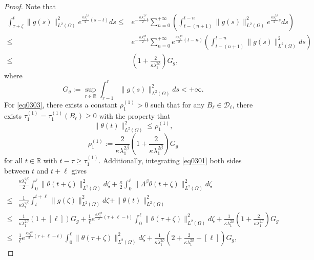 \documentclass[10pt,a4paper]{amsart}
\begin{document}
\begin{proof}
Note that
\begin{align*}
   \int_{\tau+\zeta}^{t} \|g(s)\|_{L^2(\Omega)}^2 e^{\frac{\kappa\lambda_{1}^{2\beta}}{2}(s-t)} ds
   \leq & e^{-\frac{\kappa\lambda_{1}^{2\beta}}{2}t} \sum_{n=0}^{+\infty} \left(\int_{t-(n+1)}^{t-n} \|g(s)\|_{L^2(\Omega)}^2 e^{\frac{\kappa\lambda_{1}^{2\beta}}{2}s} ds\right) \\
   \leq & e^{-\frac{\kappa\lambda_{1}^{2\beta}}{2}t} \sum_{n=0}^{+\infty} e^{\frac{\kappa\lambda_{1}^{2\beta}}{2}(t-n)} \left(\int_{t-(n+1)}^{t-n} \|g(s)\|_{L^2(\Omega)}^2 ds\right) \\
   \leq & \left(1+\frac{2}{\kappa\lambda_{1}^{2\beta}}\right)G_g,
\end{align*}
where
$$
G_g:=\sup_{r \in \mathbb{R}}\int_{r-1}^{r}\|g(s)\|_{L^2(\Omega)}^2 ds< +\infty.
$$
For \cref{eq0303}, there exists a constant $\rho_{1}^{(1)} > 0$ such that for any $B_{\ell} \in \mathcal{D}_{\ell}$, there exists $\tau_{1}^{(1)} = \tau_{1}^{(1)}(B_{\ell}) \geq 0$ with the property that 
\begin{equation}\label{eq0317}
    \|\theta(t)\|_{L^2(\Omega)}^2
   \leq 
   \rho_{1}^{(1)},
\end{equation}
\[   
   \rho_{1}^{(1)}
   :=  
   \frac{2}{\kappa\lambda_{1}^{2\beta}} \left(1+\frac{2}{\kappa\lambda_{1}^{2\beta}}\right)G_g
\]
for all $t \in \mathbb{R}$ with $t - \tau \geq \tau_{1}^{(1)}$. Additionally, integrating \cref{eq0301} both sides between $t$ and $t+\ell$ gives
\begin{equation}\label{eq0307}
\begin{aligned}
    & \frac{\kappa\lambda_1^{2\beta}}{2} \int_{0}^{\ell} \|\theta(t+\zeta)\|_{L^2(\Omega)}^2 d\zeta 
    + 
    \frac{\kappa}{2} \int_{0}^{\ell} \| \Lambda^\beta \theta(t+\zeta)\|_{L^2(\Omega)}^2 d\zeta \\
    \leq & \frac{1}{\kappa\lambda_1^{2\beta}} \int_{t}^{t+\ell} \|g(\zeta)\|_{L^2(\Omega)}^2 d\zeta + \|\theta(t)\|_{L^2(\Omega)}^2 \\
    \leq & \frac{1}{\kappa\lambda_1^{2\beta}} \left(1+[\ell]\right)G_g
    + \frac{1}{\ell} e^{\frac{\kappa\lambda_{1}^{2\beta}}{2}(\tau+\ell-t)} \int_{0}^{\ell} \|\theta(\tau+\zeta)\|_{L^2(\Omega)}^2 d\zeta 
    + \frac{1}{\kappa\lambda_{1}^{2\beta}} \left(1+\frac{2}{\kappa\lambda_{1}^{2\beta}}\right)G_g \\
    \leq & \frac{1}{\ell} e^{\frac{\kappa\lambda_{1}^{2\beta}}{2}(\tau+\ell-t)} \int_{0}^{\ell} \|\theta(\tau+\zeta)\|_{L^2(\Omega)}^2 d\zeta 
    + \frac{1}{\kappa\lambda_{1}^{2\beta}} \left(2+\frac{2}{\kappa\lambda_{1}^{2\beta}}+[\ell]\right)G_g,

\end{aligned}
\end{equation}
\end{proof}
\end{document}
